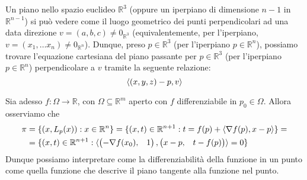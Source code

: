 \documentclass[openany, italian]{book}
\begin{document}
\begin{definition}
Un piano nello spazio euclideo $\mathbb{R}^3$ (oppure un iperpiano di dimensione $n-1$ in $\mathbb{R}^{n-1}$) si può vedere come il luogo geometrico dei punti perpendicolari ad una data direzione $v = (a, b, c) \neq 0_{\mathbb{R}^3}$ (equivalentemente, per l'iperpiano, $v=(x_1, \ldots x_n) \neq 0_{\mathbb{R}^n}$). Dunque, preso $p \in \mathbb{R}^3$ (per l'iperpiano $p \in \mathbb{R}^n$), possiamo trovare l'equazione cartesiana del piano passante per $p \in \mathbb{R}^3$ (per l'iperpiano $p \in \mathbb{R}^n$) perpendicolare a $v$ tramite la seguente relazione:
\begin{equation}
\langle (x, y, z) - p, v \rangle
\end{equation}
\label{def:iperpiano}
\end{definition}
Sia adesso $f: \Omega \to \mathbb{R}$, con $\Omega \subseteq \mathbb{R}^m$ aperto con $f$ differenziabile in $p_0 \in \Omega$. Allora osserviamo che
\begin{align*}
\pi &= \{ (x, L_p(x)) : x \in \mathbb{R}^n \} = \{ (x, t) \in \mathbb{R}^{n+1} : t = f(p) + \langle \nabla{f(p)}, x-p \rangle \} = \\
&= \{ (x, t) \in \mathbb{R}^{n+1} : \langle \begin{pmatrix} -\nabla{f(x_0)}, & 1 \end{pmatrix}, \begin{pmatrix} x-p, & t-f(p) \end{pmatrix} \rangle = 0 \}
\end{align*}
Dunque possiamo interpretare come la differenziabilità della funzione in un punto come quella funzione che descrive il piano tangente alla funzione nel punto.
\end{document}
